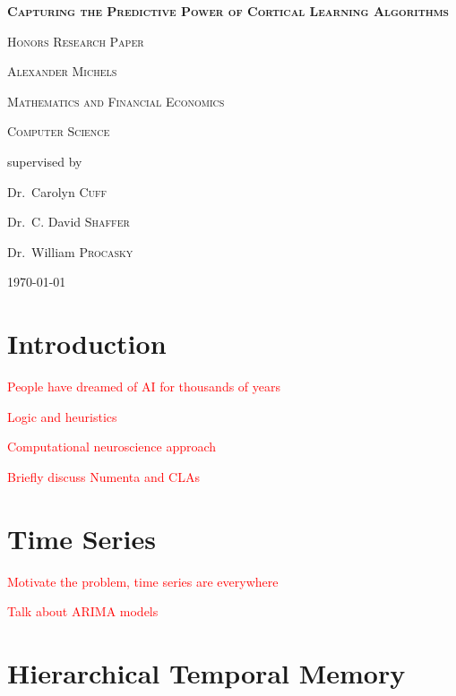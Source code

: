 \documentclass[fleqn,minimal]{article}
\newcommand\blankpage{
	\pagebreak
	\ifthispageodd{\null
		\vfill
		\vfill
		\thispagestyle{empty}
		\clearpage}{}
}
\begin{document}
	\begin{titlepage}
		\centering
		{\scshape\LARGE \textbf{Capturing the Predictive Power of Cortical Learning Algorithms} \par}
		{\scshape\LARGE Honors Research Paper \par}
		\vspace{1cm}
		{\scshape\Large Alexander Michels\par}
		\vspace{0.5cm}
		{\scshape\Large Mathematics and Financial Economics\par}
		\vspace{0.5cm}
		{\scshape\Large Computer Science\par}
		\vspace{1cm}
		\vfill \large
		supervised by\par
		Dr.~Carolyn \textsc{Cuff}\par
		Dr.~C. David \textsc{Shaffer}\par
		Dr.~William \textsc{Procasky}\par
		
		\vfill
		
		{\large \today\par}
	\end{titlepage}
	
	\blankpage
	\tableofcontents
	
	\blankpage
	\listoffigures
	
	\blankpage
	
	\section{Introduction}
	
	\textcolor{red}{People have dreamed of AI for thousands of years}
	
	\textcolor{red}{Logic and heuristics}
	
	\textcolor{red}{Computational neuroscience approach}
	
	\textcolor{red}{Briefly discuss Numenta and CLAs}
	
	\section{Time Series}
	
	\textcolor{red}{Motivate the problem, time series are everywhere}
	
	\textcolor{red}{Talk about ARIMA models}
	
	\section{Hierarchical Temporal Memory}
	
\end{document}
